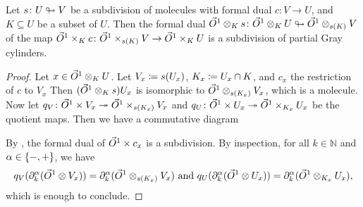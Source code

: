\begin{lem} \label{lem:subdivision_of_unitors}
    Let \( s \colon U \looparrowright V \) be a subdivision of molecules with formal dual \( c \colon V \to U \), and \( K \subseteq U \) be a subset of \( U \).
    Then the formal dual \( \vec{O}^{1} \otimes_K s \colon \vec{O}^{1} \otimes_K U \looparrowright \vec{O}^{1} \otimes_{s(K)} V \) of the map \( \vec{O}^{1} \times_K c \colon \vec{O}^{1} \times_{s(K)} V \to \vec{O}^{1} \times_K U \) is a subdivision of partial Gray cylinders.
\end{lem}
\begin{proof}
    Let \( x \in \vec{O}^{1} \otimes_K U \).
    Let \( V_x \coloneqq s({U}_{x}) \), \( K_x \coloneqq {U}_{x} \cap K \), and \( c_x \) the restriction of \( c \) to \( V_x \)
    Then \( (\vec{O}^{1} \otimes_K s){U}_{x} \) is isomorphic to \( \vec{O}^{1} \otimes_{s(K_x)} V_x \), which is a molecule.
    Now let \( q_V \colon \vec{O}^{1} \times V_x \twoheadrightarrow \vec{O}^{1} \times_{s(K_x)} V_x  \) and \( q_U \colon \vec{O}^{1} \times {U}_{x} \twoheadrightarrow \vec{O}^{1} \times_{K_x} {U}_{x} \) be the quotient maps.
    Then we have a commutative diagram
    \begin{center}
    \end{center}
    By \cite[Proposition 7.2.21]{hadzihasanovic2024combinatorics}, the formal dual of \( \vec{O}^{1} \times c_x \) is a subdivision.
    By inspection, for all \( k \in \mathbb{N} \) and \( \alpha \in \left\{ {-, +} \right\} \), we have
    \begin{equation*}
        q_V(\partial_{k}^{\alpha} (\vec{O}^{1} \otimes V_x)) = \partial_{k}^{\alpha} (\vec{O}^{1} \otimes_{s(K_x)} V_x) \text{ and } q_U(\partial_{k}^{\alpha} (\vec{O}^{1} \otimes {U}_{x})) = \partial_{k}^{\alpha} (\vec{O}^{1} \otimes_{K_x} {U}_{x}),
    \end{equation*}
    which is enough to conclude. 
\end{proof}

